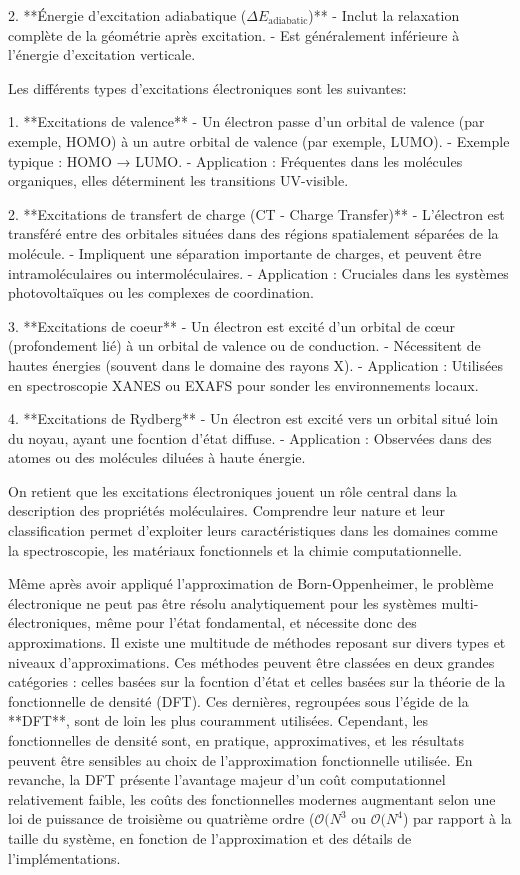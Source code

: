 \documentclass[12pt,a4paper]{report}
\begin{document}
\begin{markdown}
2. **Énergie d'excitation adiabatique ($ \Delta E_{\text{adiabatic}} $)**
   - Inclut la relaxation complète de la géométrie après excitation.
   - Est généralement inférieure à l'énergie d'excitation verticale.

Les différents types d'excitations électroniques sont les suivantes:

1. **Excitations de valence**
   - Un électron passe d'un orbital de valence (par exemple, HOMO) à un autre orbital de valence (par exemple, LUMO).
   - Exemple typique : HOMO → LUMO.
   - Application : Fréquentes dans les molécules organiques, elles déterminent les transitions UV-visible.

2. **Excitations de transfert de charge (CT - Charge Transfer)**
   - L'électron est transféré entre des orbitales situées dans des régions spatialement séparées de la molécule.
   - Impliquent une séparation importante de charges, et peuvent être intramoléculaires ou intermoléculaires.
   - Application : Cruciales dans les systèmes photovoltaïques ou les complexes de coordination.

3. **Excitations de coeur**
   - Un électron est excité d'un orbital de cœur (profondement lié) à un orbital de valence ou de conduction.
   - Nécessitent de hautes énergies (souvent dans le domaine des rayons X).
   - Application : Utilisées en spectroscopie XANES ou EXAFS pour sonder les environnements locaux.

4. **Excitations de Rydberg**
   - Un électron est excité vers un orbital situé loin du noyau, ayant une focntion d'état diffuse.
   - Application : Observées dans des atomes ou des molécules diluées à haute énergie.

On retient que les excitations électroniques jouent un rôle central dans la description des propriétés moléculaires. Comprendre leur nature et leur classification permet d’exploiter leurs caractéristiques dans les domaines comme la spectroscopie, les matériaux fonctionnels et la chimie computationnelle.

Même après avoir appliqué l'approximation de Born-Oppenheimer, le problème électronique ne peut pas être résolu analytiquement pour les systèmes multi-électroniques, même pour l'état fondamental, et nécessite donc des approximations. Il existe une multitude de méthodes reposant sur divers types et niveaux d'approximations. Ces méthodes peuvent être classées en deux grandes catégories : celles basées sur la focntion d'état et celles basées sur la théorie de la fonctionnelle de densité (DFT). Ces dernières, regroupées sous l'égide de la **DFT**, sont de loin les plus couramment utilisées. Cependant, les fonctionnelles de densité sont, en pratique, approximatives, et les résultats peuvent être sensibles au choix de l'approximation fonctionnelle utilisée. En revanche, la DFT présente l'avantage majeur d'un coût computationnel relativement faible, les coûts des fonctionnelles modernes augmentant selon une loi de puissance de troisième ou quatrième ordre ($\mathcal{O}(N^3$ ou $\mathcal{O}(N^4$) par rapport à la taille du système, en fonction de l'approximation et des détails de l'implémentations.


\end{markdown}
\end{document}
